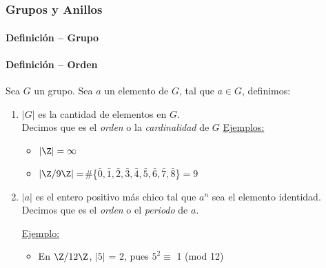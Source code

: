 \documentclass[../main.tex]{subfiles}
\begin{document}
\part[Fórmulas y Definiciones]{}

\section{Grupos y Anillos} {
    \subsection{Definición -- Grupo} {
        
    }
    
    \subsection{Definición -- Orden} {
        Sea $G$ un grupo. Sea $a$ un elemento de $G$, tal que $a \in G$, definimos:
        \begin{enumerate}
            \item {
                $|G|$ es la cantidad de elementos en $G$.
                \\ Decimos que es el \textit{orden} o la \textit{cardinalidad} de $G$
                \nln \ul{Ejemplos:} 
                \begin{itemize}
                    \item $|\Z| = \infty$
                    \item $|\Z/9\Z| = $\#\{$\bar{0},\bar{1},\bar{2},\bar{3},\bar{4},\bar{5},\bar{6},\bar{7},\bar{8}$\}$ = 9$
                \end{itemize}
            }
            
            \item $|a|$ es el entero positivo más chico tal que $a^n$ sea el elemento identidad. %
            Decimos que es el \textit{orden} o el \textit{periodo} de $a$.
            
            \nln
            
            \ul{Ejemplo:}
            
            \begin{itemize}
                \item En $\Z/12\Z$, $|5|$ = 2, pues $5^{2} \equiv$ 1 (mod 12)
            \end{itemize}
            
            
        \end{enumerate}
    }
}
    
\end{document}
